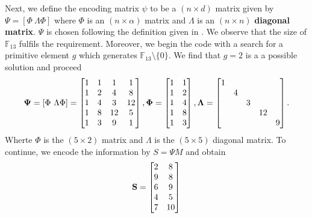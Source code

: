 \documentclass{article}
\begin{document}
Next, we define the encoding matrix $\psi $ to be a $(n\times d)$ matrix given by $\Psi = [\Phi\ \Lambda\Phi]$ where $\Phi$ is an $(n \times \alpha)$ matrix and $\Lambda$ is an $(n\times n)$ \textbf{diagonal matrix}. $\Psi$ is chosen following the definition given in \cite{Prodict_Matrix}. We observe that the size of $\mathbb{F}_{13}$ fulfils the requirement. Moreover, we begin the code with a search for a primitive element $g$ which generates $\mathbb{F}_{13}\setminus\{0\}$. We find that $g=2$ is a a possible solution and proceed
\begin{equation*}
\vb{\Psi} = [\Phi \text{ }\Lambda\Phi] =
\begin{bmatrix}
1 & 1 & 1 & 1 \\
1 & 2 & 4 & 8 \\
1 & 4 & 3 & 12 \\
1 & 8 & 12 & 5 \\
1 & 3 & 9 & 1 
\end{bmatrix}, 
\vb{\Phi} =
\begin{bmatrix}
1 & 1\\
1 & 2\\
1 & 4\\
1 & 8\\
1 & 3
\end{bmatrix},\\
\vb{\Lambda} = 
\begin{bmatrix}
1 & & & & \\
& 4 & & & \\
& & 3 & & \\
& & & 12 & \\
& & & & 9
\end{bmatrix}.
\end{equation*}
Wherte $\Phi$  is the $(5 \times 2)$ matrix and $\Lambda$ is the $(5 \times 5)$ diagonal matrix. To continue, we encode the information by $S=\Psi M$ and obtain
\begin{equation*}
\vb{S} =
\begin{bmatrix}
2 & 8 \\
9 & 8 \\
6 & 9 \\
4 & 5 \\
7 & 10 \\
\end{bmatrix}
\end{equation*}
\end{document}
